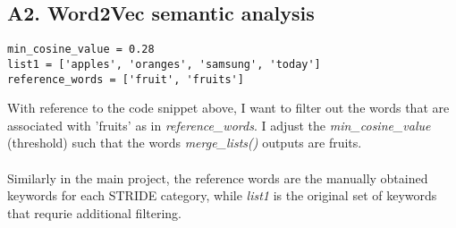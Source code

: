 \clearpage


\subsection*{A2. Word2Vec semantic analysis}\label{subsec:appendix2}
\begin{lstlisting}[frame=single]
min_cosine_value = 0.28
list1 = ['apples', 'oranges', 'samsung', 'today']
reference_words = ['fruit', 'fruits']    
\end{lstlisting}
With reference to the code snippet above, I want to filter out the words that are associated with 'fruits' as in \textit{reference\_words}. I adjust the \textit{min\_cosine\_value} (threshold) such that the words \textit{merge\_lists()} outputs are fruits. \\ \\
Similarly in the main project, the reference words are the manually obtained keywords for each STRIDE category, while \textit{list1} is the original set of keywords that requrie additional filtering.
\clearpage

